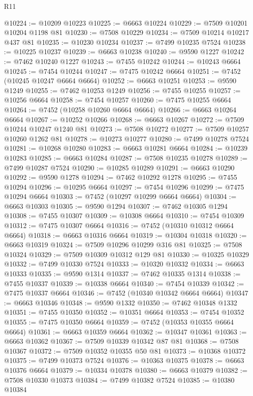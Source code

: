 \begin{lexlean}{R11}
\begin{coremodule}
{{{{{{{{{{{{{{{{{{{{{{{{{{{{{{{{{{{{{{{{{{{{{{{{{{{{{{{{{{{{{{{{{{{{{{{{{{{{{{{{{{@10224 := @10209 @10223
@10225 := @6663 @10224
@10229 := @7509 @10201 @10204 @1198 @81
@10230 := @7508 @10229
@10234 := @7509 @10214 @10217 @437 @81
@10235 := @10230 @10234
@10237 := @7499 @10235 @7524
@10238 := @10225 @10237
@10239 := @6663 @10238
@10240 := @9590 @1227
@10242 := @7462 @10240 @1227
@10243 := @7455 @10242
@10244 := @10243 @6664
@10245 := @7454 @10244
@10247 := @7475 @10242 @6664
@10251 := @7452 (@10245 @10247 @6664 @6664)
@10252 := @6663 @10251
@10253 := @9590 @1249
@10255 := @7462 @10253 @1249
@10256 := @7455 @10255
@10257 := @10256 @6664
@10258 := @7454 @10257
@10260 := @7475 @10255 @6664
@10264 := @7452 (@10258 @10260 @6664 @6664)
@10266 := @6663 @10264 @6664
@10267 := @10252 @10266
@10268 := @6663 @10267
@10272 := @7509 @10244 @10247 @1240 @81
@10273 := @7508 @10272
@10277 := @7509 @10257 @10260 @1262 @81
@10278 := @10273 @10277
@10280 := @7499 @10278 @7524
@10281 := @10268 @10280
@10283 := @6663 @10281 @6664
@10284 := @10239 @10283
@10285 := @6663 @10284
@10287 := @7508 @10235 @10278
@10289 := @7499 @10287 @7524
@10290 := @10285 @10289
@10291 := @6663 @10290
@10292 := @9590 @1278
@10294 := @7462 @10292 @1278
@10295 := @7455 @10294
@10296 := @10295 @6664
@10297 := @7454 @10296
@10299 := @7475 @10294 @6664
@10303 := @7452 (@10297 @10299 @6664 @6664)
@10304 := @6663 @10303
@10305 := @9590 @1294
@10307 := @7462 @10305 @1294
@10308 := @7455 @10307
@10309 := @10308 @6664
@10310 := @7454 @10309
@10312 := @7475 @10307 @6664
@10316 := @7452 (@10310 @10312 @6664 @6664)
@10318 := @6663 @10316 @6664
@10319 := @10304 @10318
@10320 := @6663 @10319
@10324 := @7509 @10296 @10299 @316 @81
@10325 := @7508 @10324
@10329 := @7509 @10309 @10312 @129 @81
@10330 := @10325 @10329
@10332 := @7499 @10330 @7524
@10333 := @10320 @10332
@10334 := @6663 @10333
@10335 := @9590 @1314
@10337 := @7462 @10335 @1314
@10338 := @7455 @10337
@10339 := @10338 @6664
@10340 := @7454 @10339
@10342 := @7475 @10337 @6664
@10346 := @7452 (@10340 @10342 @6664 @6664)
@10347 := @6663 @10346
@10348 := @9590 @1332
@10350 := @7462 @10348 @1332
@10351 := @7455 @10350
@10352 := @10351 @6664
@10353 := @7454 @10352
@10355 := @7475 @10350 @6664
@10359 := @7452 (@10353 @10355 @6664 @6664)
@10361 := @6663 @10359 @6664
@10362 := @10347 @10361
@10363 := @6663 @10362
@10367 := @7509 @10339 @10342 @87 @81
@10368 := @7508 @10367
@10372 := @7509 @10352 @10355 @50 @81
@10373 := @10368 @10372
@10375 := @7499 @10373 @7524
@10376 := @10363 @10375
@10378 := @6663 @10376 @6664
@10379 := @10334 @10378
@10380 := @6663 @10379
@10382 := @7508 @10330 @10373
@10384 := @7499 @10382 @7524
@10385 := @10380 @10384
}}}}}}}}}}}}}}}}}}}}}}}}}}}}}}}}}}}}}}}}}}}}}}}}}}}}}}}}}}}}}}}}}}}}}}}}}}}}}}}}}}
\end{coremodule}
\end{lexlean}
